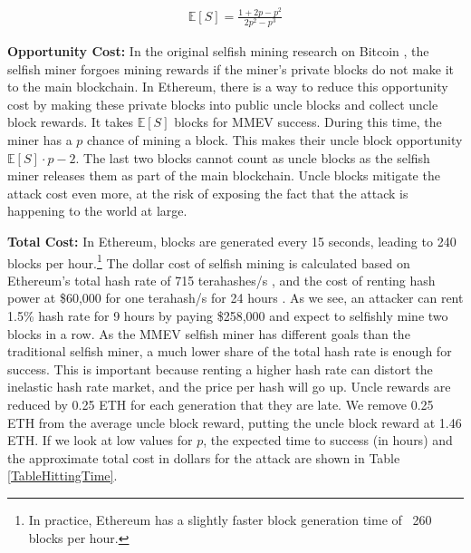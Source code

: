 \begin{align*}
    \mathbb{E}[S] = \frac{1 + 2p - p^2}{2p^2 - p^3}
\end{align*}

\noindent
\textbf{Opportunity Cost:} In the original selfish mining research on Bitcoin \cite{eyal2014majority}, the selfish miner forgoes mining rewards if the miner's private blocks do not make it to the main blockchain. In Ethereum, there is a way to reduce this opportunity cost by making these private blocks into public uncle blocks and collect uncle block rewards. It takes $\mathbb{E}[S]$ blocks for MMEV success. During this time, the miner has a $p$ chance of mining a block. This makes their uncle block opportunity $\mathbb{E}[S] \cdot p - 2$. The last two blocks cannot count as uncle blocks as the selfish miner releases them as part of the main blockchain. Uncle blocks mitigate the attack cost even more, at the risk of exposing the fact that the attack is happening to the world at large.

\textbf{Total Cost:} In Ethereum, blocks are generated every 15 seconds, leading to 240 blocks per hour.\footnote{In practice, Ethereum has a slightly faster block generation time of ~260 blocks per hour.} The dollar cost of selfish mining is calculated based on Ethereum's total hash rate of 715 terahashes/s \cite{ethereum_hash_rate}, and the cost of renting hash power at \$60,000 for one terahash/s for 24 hours \cite{nicehash}. As we see, an attacker can rent 1.5\% hash rate for 9 hours by paying \$258,000 and expect to selfishly mine two blocks in a row. As the MMEV selfish miner has different goals than the traditional selfish miner, a much lower share of the total hash rate is enough for success. This is important because renting a higher hash rate can distort the inelastic hash rate market, and the price per hash will go up. Uncle rewards are reduced by 0.25 ETH for each generation that they are late. We remove 0.25 ETH from the average uncle block reward, putting the uncle block reward at 1.46 ETH. If we look at low values for $p$, the expected time to success (in hours) and the approximate total cost in dollars for the attack are shown in Table \ref{TableHittingTime}.
\break

